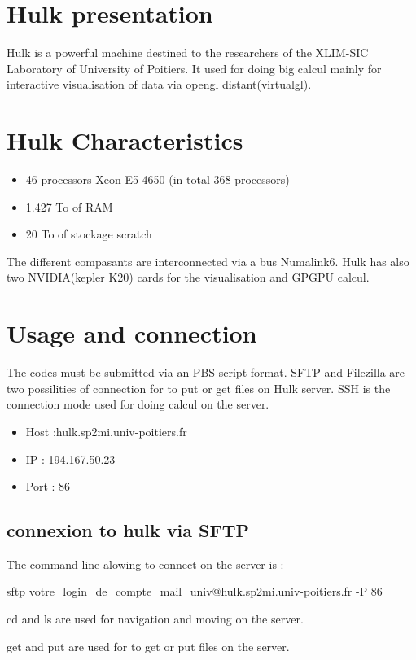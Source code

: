 \documentclass[12pt]{article}
\begin{document}
\section*{Hulk presentation}


Hulk is a powerful machine destined to the researchers of the XLIM-SIC Laboratory of University of Poitiers. It used for doing big calcul mainly for interactive visualisation of data via opengl distant(virtualgl).

\section{Hulk Characteristics}
\begin{itemize}
	\item	 46 processors Xeon E5 4650 (in total 368 processors)
	\item	1.427 To of RAM
	\item	20 To of stockage scratch
\end{itemize}
	
The different compasants are interconnected via a bus Numalink6. Hulk has also two NVIDIA(kepler K20)  cards for the visualisation and GPGPU calcul.

\section{Usage and connection }
The codes must be submitted via an PBS script format.
SFTP and Filezilla are two possilities of connection for to put or get files on Hulk server. 
SSH is the connection mode used for doing calcul on the server.
\begin{itemize}
	\item	 Host :hulk.sp2mi.univ-poitiers.fr
	\item	IP : 194.167.50.23 
	\item	Port : 86
\end{itemize}

\subsection{connexion to hulk via SFTP}

The command line alowing to connect on the server is :
 
sftp votre\_login\_de\_compte\_mail\_univ@hulk.sp2mi.univ-poitiers.fr -P 86

cd and ls are used for navigation and moving on the server.

get and put are used for to get or put files  on the server.
\end{document}
